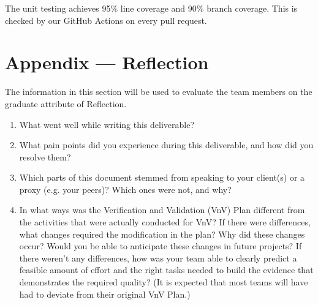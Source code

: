 \documentclass[12pt, titlepage]{article}
\begin{document}
The unit testing achieves 95\% line coverage and 90\% branch
coverage. This is checked by our GitHub Actions on every pull request.




\newpage{}
\section*{Appendix --- Reflection}

The information in this section will be used to evaluate the team members on the
graduate attribute of Reflection.



\begin{enumerate}
  \item What went well while writing this deliverable?
  \item What pain points did you experience during this deliverable, and how
    did you resolve them?
  \item Which parts of this document stemmed from speaking to your client(s) or
    a proxy (e.g. your peers)? Which ones were not, and why?
  \item In what ways was the Verification and Validation (VnV) Plan different
    from the activities that were actually conducted for VnV?  If there were
    differences, what changes required the modification in the plan?  Why did
    these changes occur?  Would you be able to anticipate these
    changes in future
    projects?  If there weren't any differences, how was your team
    able to clearly
    predict a feasible amount of effort and the right tasks needed to build the
    evidence that demonstrates the required quality?  (It is expected that most
    teams will have had to deviate from their original VnV Plan.)
\end{enumerate}
\end{document}
